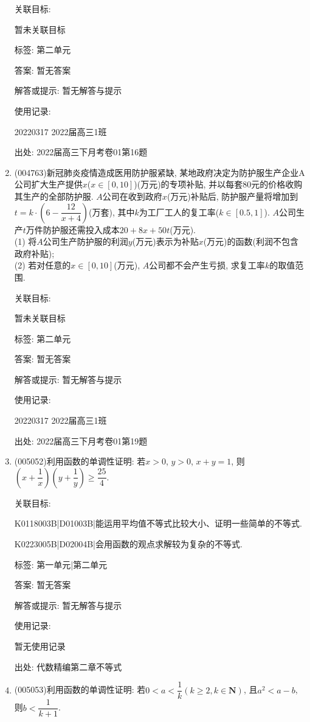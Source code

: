 \documentclass[10pt,a4paper]{article}
\begin{document}
\begin{enumerate}[1.]
关联目标:

暂未关联目标



标签: 第二单元

答案: 暂无答案

解答或提示: 暂无解答与提示

使用记录:

20220317	2022届高三1班	


出处: 2022届高三下月考卷01第16题
\item { (004763)}新冠肺炎疫情造成医用防护服紧缺, 某地政府决定为防护服生产企业A公司扩大生产提供$x$($x\in [0,10]$)(万元)的专项补贴, 并以每套$80$元的价格收购其生产的全部防护服. $A$公司在收到政府$x$(万元)补贴后, 防护服产量将增加到$t=k\cdot (6-\dfrac{12}{x+4})$(万套), 其中$k$为工厂工人的复工率($k\in [0.5,1]$). $A$公司生产$t$万件防护服还需投入成本$20+8x+50t$(万元).\\
(1) 将$A$公司生产防护服的利润$y$(万元)表示为补贴$x$(万元)的函数(利润不包含政府补贴);\\
(2) 若对任意的$x\in [0,10]$(万元), $A$公司都不会产生亏损, 求复工率$k$的取值范围.


关联目标:

暂未关联目标



标签: 第二单元

答案: 暂无答案

解答或提示: 暂无解答与提示

使用记录:

20220317	2022届高三1班		


出处: 2022届高三下月考卷01第19题
\item { (005052)}利用函数的单调性证明: 若$x>0$, $y>0$, $x+y=1$, 则$(x+\dfrac 1x)(y+\dfrac 1y)\ge \dfrac{25}4$.


关联目标:

K0118003B|D01003B|能运用平均值不等式比较大小、证明一些简单的不等式.

K0223005B|D02004B|会用函数的观点求解较为复杂的不等式.



标签: 第一单元|第二单元

答案: 暂无答案

解答或提示: 暂无解答与提示

使用记录:

暂无使用记录


出处: 代数精编第二章不等式
\item { (005053)}利用函数的单调性证明: 若$0<a<\dfrac 1k(k\ge 2,k\in \mathbf{N})$, 且$a^2<a-b$, 则$b<\dfrac 1{k+1}$.



\end{enumerate}
\end{document}
